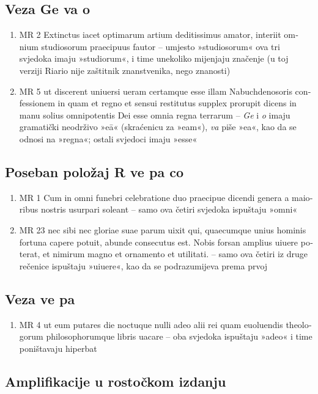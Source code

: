 \documentclass[a5paper,twoside]{article}
\begin{document}
\subsection{Veza Ge va o}
\begin{enumerate}[label=\alph*)]
\item MR 2 \textlatin{Extinctus iacet optimarum artium deditissimus amator, interiit omnium studiosorum praecipuus fautor} – umjesto »studiosorum« ova tri svjedoka imaju »studiorum«, i time unekoliko mijenjaju značenje (u toj verziji Riario nije zaštitnik znanstvenika, nego znanosti)
\item MR 5 \textlatin{ut discerent uniuersi ueram certamque esse illam Nabuchdenosoris confessionem in quam et regno et sensui restitutus supplex prorupit dicens in manu solius omnipotentis Dei esse omnia regna terrarum} – \textit{Ge} i \textit{o} imaju gramatički neodrživo »eā« (skraćenicu za »eam«), \textit{va} piše »ea«, kao da se odnosi na »regna«; ostali svjedoci imaju »esse«
\end{enumerate}
\subsection{Poseban položaj R ve pa co}
\begin{enumerate}[label=\alph*)]
\item MR 1 \textlatin{Cum in omni funebri celebratione duo praecipue dicendi genera a maioribus nostris usurpari soleant} – samo ova četiri svjedoka ispuštaju »omni«
\item MR 23 \textlatin{nec sibi nec gloriae suae parum uixit qui, quaecumque unius hominis fortuna capere potuit, abunde consecutus est. Nobis forsan amplius uiuere poterat, et nimirum magno et ornamento et utilitati.} – samo ova četiri iz druge rečenice ispuštaju »uiuere«, kao da se podrazumijeva prema prvoj
\end{enumerate}
\subsection{Veza ve pa}
\begin{enumerate}[label=\alph*)]
\item MR 4 \textlatin{ut eum putares die noctuque nulli adeo alii rei quam euoluendis theologorum philosophorumque libris uacare} – oba svjedoka ispuštaju »adeo« i time poništavaju hiperbat
\end{enumerate}

\subsection{Amplifikacije u rostočkom izdanju}
\end{document}
